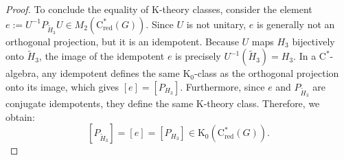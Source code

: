 \documentclass[a4paper,leqno,12pt]{article}
\numberwithin{equation}{section}
\theoremstyle{plain}
\theoremstyle{definition}
\theoremstyle{remark}
\newcommand{\Cs}{\mathrm{C}^*}
\newcommand{\Csr}{\mathrm{C}^*_{\text{red}}}
\begin{document}
\begin{proof}
To conclude the equality of K-theory classes, consider the element $e := U^{-1} P_{\tilde{H}_3} U \in M_2(\Csr(G))$. Since $U$ is not unitary, $e$ is generally not an orthogonal projection, but it is an idempotent. Because $U$ maps $H_3$ bijectively onto $\tilde{H}_3$, the image of the idempotent $e$ is precisely $U^{-1}(\tilde{H}_3) = H_3$. In a $\Cs$-algebra, any idempotent defines the same $\mathrm K_0$-class as the orthogonal projection onto its image, which gives $[e] = [P_{H_3}]$. Furthermore, since $e$ and $P_{\tilde{H}_3}$ are conjugate idempotents, they define the same K-theory class. Therefore, we obtain:
\[
[P_{\tilde{H}_3}] = [e] = [P_{H_3}] \in \mathrm K_0(\Csr(G)).
\]        
		

\end{proof}
\end{document}
